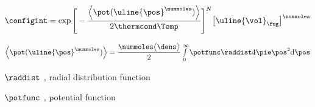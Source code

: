 \begin{bigmdframed}

    
    \begin{listone}
    
    \item $\configint = \exp\Bigg[-\dfrac{\Big\langle\pot(\uline{\pos}^{\nummoles})\Big\rangle}{2\thermcond\Temp}\Bigg]^N\big[\uline{\vol}_{\fug}\big]^{\nummoles}$
    
    	\begin{listtwo}
    
    	\item $\Big\langle\pot(\uline{\pos}^{\nummoles})\Big\rangle = \dfrac{\nummoles\big\langle\dens\big\rangle}{2}\int\limits_{0}^{\infty}\potfunc\raddist4\pie\pos^2\mathrm{d}\pos $

			\begin{listthree}

    		\item $\raddist$ , radial distribution function 
    		\item $\potfunc$ , potential function
    	
        	\end{listthree}
    
    	\end{listtwo}
    
    \end{listone}
    
\end{bigmdframed}